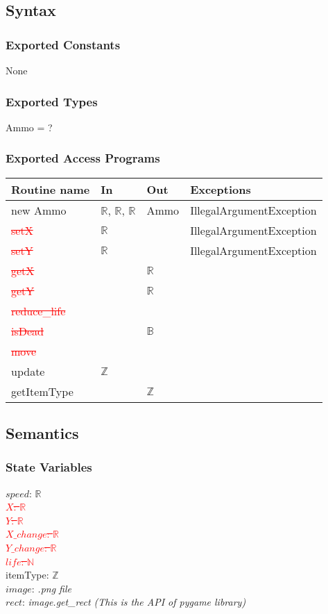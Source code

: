 \documentclass[12pt]{article}
\begin{document}
\subsection*{Syntax}
\subsubsection*{Exported Constants}
None
\subsubsection*{Exported Types}
Ammo = ?
\subsubsection*{Exported Access Programs}
\begin{tabular}{| l | l | l | p{5cm} |}
\hline
\textbf{Routine name} & \textbf{In} & \textbf{Out} & \textbf{Exceptions}\\
\hline
new Ammo & $\mathbb{R}$, $\mathbb{R}$, $\mathbb{R}$ & Ammo & IllegalArgumentException\\
\hline
\textcolor{red}{\st{setX}} & $\mathbb{R}$ &  & IllegalArgumentException\\
\hline
\textcolor{red}{\st{setY}} & $\mathbb{R}$ &  & IllegalArgumentException\\
\hline
\textcolor{red}{\st{getX }}&    & $\mathbb{R}$ & \\
\hline
\textcolor{red}{\st{getY}} &    & $\mathbb{R}$ & \\
\hline
\textcolor{red}{\st{reduce\_life}} & & & \\
\hline
\textcolor{red}{\st{isDead}} & & $\mathbb{B}$ & \\
\hline
\textcolor{red}{\st{move}} & & &\\
\hline
update & $\mathbb{Z}$ &&\\
\hline
getItemType &&$\mathbb{Z}$&\\
\hline
\end{tabular}

\subsection*{Semantics}
\subsubsection*{State Variables}
$\mathit{speed}$: $\mathbb{R}$\\
\textcolor{red}{\st{$\mathit{X}$: $\mathbb{R}$}}\\
\textcolor{red}{\st{$\mathit{Y}$: $\mathbb{R}$}}\\
\textcolor{red}{\st{$\mathit{X\_change}$: $\mathbb{R}$}}\\
\textcolor{red}{\st{$\mathit{Y\_change}$: $\mathbb{R}$}}\\
\textcolor{red}{\st{$\mathit{life}$: $\mathbb{N}$}}\\
itemType: $\mathbb{Z}$\\
$\mathit{image}$: \textit{.png file}\\
$\mathit{rect}$: \textit{image.get\_rect (This is the API of pygame library)}
\end{document}
